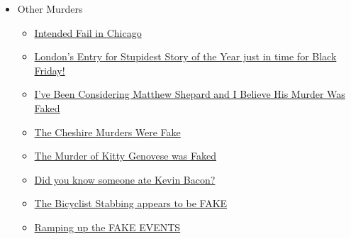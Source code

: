 \documentclass{article}
\newcommand{\insertmydocument}[2]{ %
  \item \href{http://www.mileswmathis.com/#2}{#1}
}
\begin{document}
\begin{itemize}
\begin{itemize}
    \item Other Murders
    \begin{itemize}

      \insertmydocument{Intended Fail in Chicago}{new1.pdf}
      \insertmydocument{London's Entry for Stupidest Story of the Year just in time for Black Friday!}{ponce.pdf}
      \insertmydocument{I’ve Been Considering Matthew Shepard and I Believe His Murder Was Faked}{shep.pdf}
      \insertmydocument{The Cheshire Murders Were Fake}{hayes.pdf}
      \insertmydocument{The Murder of Kitty Genovese was Faked}{kitty.pdf}
      \insertmydocument{Did you know someone ate Kevin Bacon?}{latunski.pdf}
      \insertmydocument{The Bicyclist Stabbing appears to be FAKE}{mammon.pdf}
      \insertmydocument{Ramping up the FAKE EVENTS}{carson.pdf}
    \end{itemize}
  \end{itemize}
\end{itemize}
\end{document}

